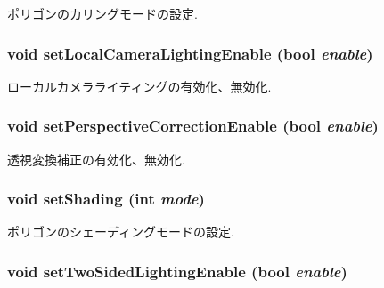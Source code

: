 ポリゴンのカリングモードの設定. \hypertarget{classm3g_1_1PolygonMode_232d4cff53e6fc4863e144dc61e9465c}{
\subsubsection[{setLocalCameraLightingEnable}]{\setlength{\rightskip}{0pt plus 5cm}void setLocalCameraLightingEnable (bool {\em enable})}}
\label{classm3g_1_1PolygonMode_232d4cff53e6fc4863e144dc61e9465c}


ローカルカメラライティングの有効化、無効化. \hypertarget{classm3g_1_1PolygonMode_81003e409298c3247ab2fed98a7270e9}{
\subsubsection[{setPerspectiveCorrectionEnable}]{\setlength{\rightskip}{0pt plus 5cm}void setPerspectiveCorrectionEnable (bool {\em enable})}}
\label{classm3g_1_1PolygonMode_81003e409298c3247ab2fed98a7270e9}


透視変換補正の有効化、無効化. \hypertarget{classm3g_1_1PolygonMode_ebd2bc289af0e5cbee5ea29cbc55ba5a}{
\subsubsection[{setShading}]{\setlength{\rightskip}{0pt plus 5cm}void setShading (int {\em mode})}}
\label{classm3g_1_1PolygonMode_ebd2bc289af0e5cbee5ea29cbc55ba5a}


ポリゴンのシェーディングモードの設定. \hypertarget{classm3g_1_1PolygonMode_8687b0d3016a777d32e7ebfa1ffd45aa}{
\subsubsection[{setTwoSidedLightingEnable}]{\setlength{\rightskip}{0pt plus 5cm}void setTwoSidedLightingEnable (bool {\em enable})}}
\label{classm3g_1_1PolygonMode_8687b0d3016a777d32e7ebfa1ffd45aa}


